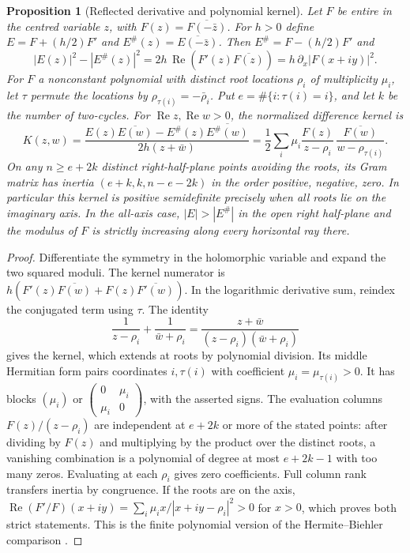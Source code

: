 \documentclass[11pt,reqno]{amsart}
\newtheorem{proposition}[theorem]{Proposition}
\theoremstyle{definition}
\theoremstyle{remark}
\numberwithin{equation}{section}
\newcommand{\re}{\operatorname{Re}}
\begin{document}
\begin{proposition}[Reflected derivative and polynomial kernel]
\label{m6:hb}
Let \(F\) be entire in the centred variable \(z\), with
\(F(z)=\overline{F(-\bar z)}\). For \(h>0\) define
\(E=F+(h/2)F'\) and \(E^\#(z)=\overline{E(-\bar z)}\).
Then \(E^\#=F-(h/2)F'\) and
\[
 |E(z)|^2-|E^\#(z)|^2
   =2h\,\re(F'(z)\overline{F(z)})
   =h\,\partial_x|F(x+iy)|^2.
\]
For \(F\) a nonconstant polynomial with distinct root locations
\(\rho_i\) of multiplicity \(\mu_i\), let \(\tau\) permute the
locations by \(\rho_{\tau(i)}=-\bar\rho_i\).
Put \(e=\#\{i:\tau(i)=i\}\), and let \(k\) be the number of
two-cycles. For \(\re z,\re w>0\), the normalized difference
kernel is
\[
 K(z,w)=\frac{E(z)\overline{E(w)}-E^\#(z)\overline{E^\#(w)}}
                    {2h(z+\bar w)}
       =\frac12\sum_i\mu_i
          \frac{F(z)}{z-\rho_i}\,
          \overline{\frac{F(w)}{w-\rho_{\tau(i)}}}.
\]
On any \(n\ge e+2k\) distinct right-half-plane points avoiding
the roots, its Gram matrix has inertia \((e+k,k,n-e-2k)\)
in the order positive, negative, zero. In particular this
kernel is positive semidefinite precisely when all roots lie
on the imaginary axis. In the all-axis case,
\(|E|>|E^\#|\) in the open right half-plane and the modulus of \(F\)
is strictly increasing along every horizontal ray there.
\end{proposition}
\begin{proof}
Differentiate the symmetry in the holomorphic variable and expand
the two squared moduli. The kernel numerator is
\(h(F'(z)\overline{F(w)}+F(z)\overline{F'(w)})\).
In the logarithmic derivative sum, reindex the conjugated term
using \(\tau\). The identity
\[
 \frac1{z-\rho_i}+\frac1{\bar w+\rho_i}
    =\frac{z+\bar w}{(z-\rho_i)(\bar w+\rho_i)}
\]
gives the kernel, which extends at roots by polynomial division.
Its middle Hermitian form pairs coordinates \(i,\tau(i)\)
with coefficient \(\mu_i=\mu_{\tau(i)}>0\).
It has blocks \((\mu_i)\) or
\(\left(\begin{smallmatrix}0&\mu_i\\\mu_i&0\end{smallmatrix}\right)\),
with the asserted signs. The evaluation columns
\(F(z)/(z-\rho_i)\) are independent at \(e+2k\) or more of the
stated points: after dividing by \(F(z)\) and multiplying by the
product over the distinct roots, a vanishing combination is a
polynomial of degree at most \(e+2k-1\) with too many zeros.
Evaluating at each \(\rho_i\) gives zero coefficients. Full column
rank transfers inertia by congruence. If the roots are on the
axis, \(\re(F'/F)(x+iy)=\sum_i\mu_i x/|x+iy-\rho_i|^2>0\)
for \(x>0\), which proves both strict statements. This is the
finite polynomial version of the Hermite--Biehler comparison
\cite{m6:deBranges}.
\end{proof}
\end{document}
